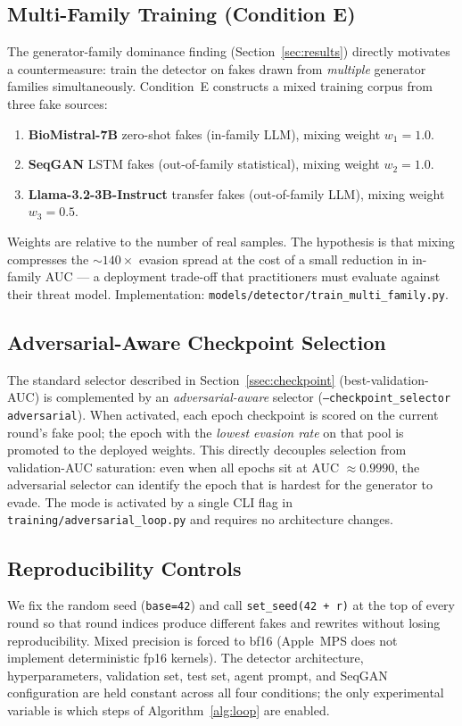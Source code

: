 \subsection{Multi-Family Training (Condition E)}
\label{ssec:multifamily}

The generator-family dominance finding (Section~\ref{sec:results}) directly
motivates a countermeasure: train the detector on fakes drawn from
\emph{multiple} generator families simultaneously. Condition~E constructs a
mixed training corpus from three fake sources:
\begin{enumerate}[leftmargin=*]
\item \textbf{BioMistral-7B} zero-shot fakes (in-family LLM),
  mixing weight \(w_1 = 1.0\).
\item \textbf{SeqGAN} LSTM fakes (out-of-family statistical),
  mixing weight \(w_2 = 1.0\).
\item \textbf{Llama-3.2-3B-Instruct} transfer fakes (out-of-family LLM),
  mixing weight \(w_3 = 0.5\).
\end{enumerate}
Weights are relative to the number of real samples. The hypothesis is that
mixing compresses the \(\sim\!140\times\) evasion spread at the cost of a
small reduction in in-family AUC — a deployment trade-off that practitioners
must evaluate against their threat model. Implementation:
\texttt{models/detector/train\_multi\_family.py}.

\subsection{Adversarial-Aware Checkpoint Selection}
\label{ssec:ckpt_adv}

The standard selector described in Section~\ref{ssec:checkpoint}
(best-validation-AUC) is complemented by an \emph{adversarial-aware}
selector (\texttt{--checkpoint\_selector adversarial}). When activated,
each epoch checkpoint is scored on the current round's fake pool; the epoch
with the \emph{lowest evasion rate} on that pool is promoted to the deployed
weights. This directly decouples selection from validation-AUC saturation:
even when all epochs sit at AUC $\approx 0.9990$, the adversarial selector
can identify the epoch that is hardest for the generator to evade. The
mode is activated by a single CLI flag in \texttt{training/adversarial\_loop.py}
and requires no architecture changes.

\subsection{Reproducibility Controls}
\label{ssec:repro}
We fix the random seed (\texttt{base=42}) and call
\texttt{set\_seed(42 + r)} at the top of every round so that round indices
produce different fakes and rewrites without losing reproducibility. Mixed
precision is forced to bf16 (Apple~MPS does not implement deterministic
fp16 kernels). The detector architecture, hyperparameters, validation set,
test set, agent prompt, and SeqGAN configuration are held constant across
all four conditions; the only experimental variable is which steps of
Algorithm~\ref{alg:loop} are enabled.
